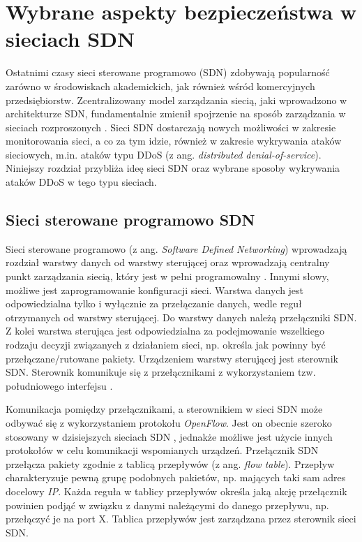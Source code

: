 \chapter{Wybrane aspekty bezpieczeństwa w sieciach SDN }

Ostatnimi czasy sieci sterowane programowo (SDN) zdobywają popularność zarówno
w środowiskach akademickich, jak również wśród komercyjnych przedsiębiorstw.
Zcentralizowany model zarządzania siecią, jaki wprowadzono w architekturze SDN,
fundamentalnie zmienił spojrzenie na sposób zarządzania w sieciach rozproszonych
\cite{ddosNYarticle}. Sieci SDN dostarczają nowych możliwości w zakresie
monitorowania sieci, a co za tym idzie, również w zakresie wykrywania ataków
sieciowych, m.in. ataków typu DDoS (z ang. \textit{distributed
  denial-of-service}). Niniejszy rozdział przybliża ideę sieci SDN oraz wybrane
sposoby wykrywania ataków DDoS w tego typu sieciach. 

\section{Sieci sterowane programowo SDN}
Sieci sterowane programowo (z ang. \textit{Software Defined Networking})
wprowadzają rozdział warstwy danych od warstwy sterującej oraz wprowadzają
centralny punkt zarządzania siecią, który jest w pełni programowalny \cite{onf}.
Innymi słowy, możliwe jest zaprogramowanie konfiguracji sieci. Warstwa danych
jest odpowiedzialna tylko i wyłącznie za przełączanie danych, wedle reguł
otrzymanych od warstwy sterującej. Do warstwy danych należą przełączniki SDN.
Z kolei warstwa sterująca jest odpowiedzialna za podejmowanie wszelkiego
rodzaju decyzji związanych z działaniem sieci, np. określa jak powinny być
przełączane/rutowane pakiety. Urządzeniem warstwy sterującej jest sterownik
SDN. Sterownik komunikuje się z przełącznikami z wykorzystaniem tzw.
południowego interfejsu \cite{sdninterfaces}.

Komunikacja pomiędzy przełącznikami, a sterownikiem w sieci SDN może odbywać się
z wykorzystaniem protokołu \textit{OpenFlow}. Jest on obecnie szeroko stosowany
w dzisiejszych sieciach SDN \cite{ddoskoreaarticle}, jednakże możliwe jest
użycie innych protokołów w celu komunikacji wspomianych urządzeń. Przełącznik
SDN przełącza pakiety zgodnie z tablicą przepływów (z ang. \textit{flow table}).
Przepływ charakteryzuje pewną grupę podobnych pakietów, np. mających taki sam
adres docelowy \textit{IP}. Każda reguła w tablicy przepływów określa jaką akcję
przełącznik powinien podjąć w związku z danymi należącymi do danego
przepływu, np. przełączyć je na port X. Tablica przepływów jest zarządzana przez
sterownik sieci SDN.

